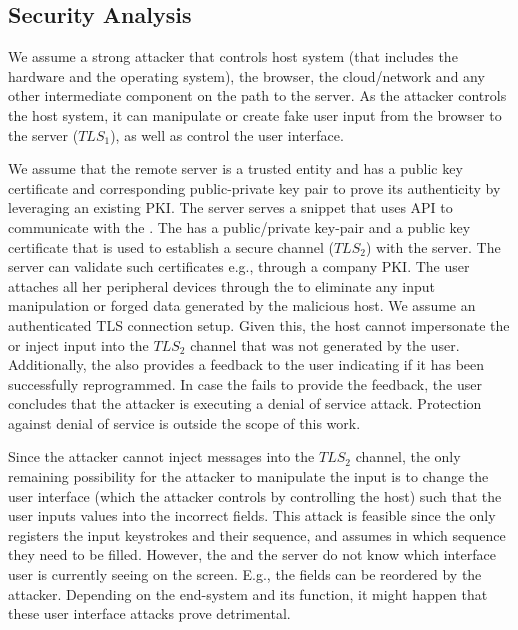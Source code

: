 \iffalse
\subsection{Security Analysis} 
\label{sec:systemDesign:security_analysis}

We assume a strong attacker that controls host system (that includes the hardware and the operating system), the browser, the cloud/network and any other intermediate component on the path to the server. As the attacker controls the host system, it can manipulate or create fake user input from the browser to the server ($TLS_1$), as well as control the user interface.

We assume that the remote server is a trusted entity and has a public key certificate and corresponding public-private key pair to prove its authenticity by leveraging an existing PKI. The server serves a \js snippet that uses \webusb API to communicate with the \device. The \device has a public/private key-pair and a public key certificate that is used to establish a secure channel ($TLS_2$) with the server. The server can validate such certificates e.g., through a company PKI. The user attaches all her peripheral devices through the \device to eliminate any input manipulation or forged data generated by the malicious host. We assume an authenticated TLS connection setup. Given this, the host cannot impersonate the \device or inject input into the $TLS_2$ channel that was not generated by the user. 
Additionally, the \device also provides a feedback to the user indicating if it has been successfully reprogrammed. In case the \device fails to provide the feedback, the user concludes that the attacker is executing a denial of service attack. Protection against denial of service is outside the scope of this work.

Since the attacker cannot inject messages into the $TLS_2$ channel, the only remaining possibility for the attacker to manipulate the input is to change the user interface (which the attacker controls by controlling the host) such that the user inputs values into the incorrect fields. 
This attack is feasible since the \device only registers the input keystrokes and their sequence, and assumes in which sequence they need to be filled. However, the \device and the server do not know which interface user is currently seeing on the screen. E.g., the fields can be reordered by the attacker. Depending on the end-system and its function, it might happen that these user interface attacks prove detrimental. 


